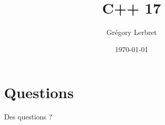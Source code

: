 \documentclass[t, 10pt]{beamer}
\author{Grégory Lerbret}
\title{C++ 17}
\date{\today}
\begin{document}
\frame[plain]{\maketitle}



\section*{Questions}
\begin{frame}[c]
	\begin{center}
		\huge Des questions ?
	\end{center}
\end{frame}


\end{document}
